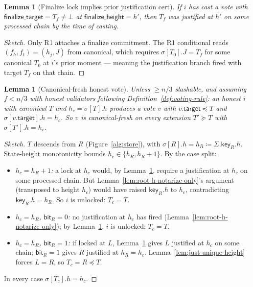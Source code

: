 \documentclass{article}
\newcommand{\target}{\mathsf{target}}
\newcommand{\finalizeHeight}{\mathsf{finalize\_height}}
\newcommand{\finalizeTarget}{\mathsf{finalize\_target}}
\newcommand{\key}{\mathsf{key}}
\newcommand{\bit}{\mathsf{bit}}
\theoremstyle{plain}
\newtheorem{lemma}[theorem]{Lemma}
\theoremstyle{definition}
\theoremstyle{remark}
\begin{document}
\begin{lemma}[Finalize lock implies prior justification cert]\label{lem:no-finalize-without-just}
If $i$ has cast a vote with $\finalizeTarget = T_f \neq \bot$ at $\finalizeHeight = h'$, then $T_f$ was justified at $h'$ on some processed chain by the time of casting.
\end{lemma}

\begin{proof}[Sketch] Only R1 attaches a finalize commitment. The R1 conditional reads $(f_h, f_t) = (h_j, J)$ from canonical, which requires $\sigma[T_0].J = T_f$ for some canonical $T_0$ at $i$'s prior moment --- meaning the justification branch fired with target $T_f$ on that chain. \end{proof}

\begin{lemma}[Canonical-fresh honest vote]\label{lem:canonical-fresh-honest-vote}
Unless $\geq n/3$ slashable, and assuming $f < n/3$ with honest validators following Definition~\ref{def:voting-rule}: an honest $i$ with canonical $T$ and $h_c = \sigma[T].h$ produces a vote $v$ with $v.\target \preceq T$ and $\sigma[v.\target].h = h_c$. So $v$ is canonical-fresh on every extension $T' \succeq T$ with $\sigma[T'].h = h_c$.
\end{lemma}

\begin{proof}[Sketch]
$T$ descends from $R$ (Figure~\ref{alg:store}), with $\sigma[R].h = h_R \coloneqq \Sigma.\key_R.h$. State-height monotonicity bounds $h_c \in \{h_R, h_R + 1\}$. By the case split:
\begin{itemize}
\item \emph{$h_c = h_R + 1$:} a lock at $h_c$ would, by Lemma~\ref{lem:no-finalize-without-just}, require a justification at $h_c$ on some processed chain. But Lemma~\ref{lem:root-h-notarize-only}'s argument (transposed to height $h_c$) would have raised $\key_R.h$ to $h_c$, contradicting $\key_R.h = h_R$. So $i$ is unlocked: $T_c = T$.
\item \emph{$h_c = h_R$, $\bit_R = 0$:} no justification at $h_c$ has fired (Lemma~\ref{lem:root-h-notarize-only}); by Lemma~\ref{lem:no-finalize-without-just}, $i$ is unlocked: $T_c = T$.
\item \emph{$h_c = h_R$, $\bit_R = 1$:} if locked at $L$, Lemma~\ref{lem:no-finalize-without-just} gives $L$ justified at $h_c$ on some chain; $\bit_R = 1$ gives $R$ justified at $h_R = h_c$. Lemma~\ref{lem:just-unique-height} forces $L = R$, so $T_c = R \preceq T$.
\end{itemize}
In every case $\sigma[T_c].h = h_c$.
\end{proof}
\end{document}
